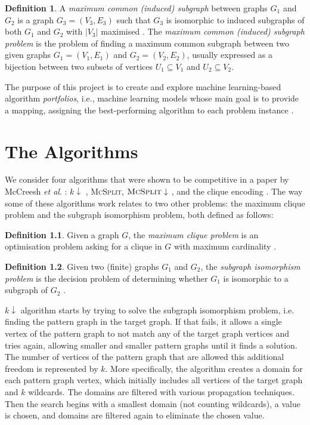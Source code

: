 \documentclass{l4proj}
\theoremstyle{definition}
\newtheorem{definition}{Definition}[chapter]
\theoremstyle{remark}
\begin{document}
\begin{definition}
  A \emph{maximum common (induced) subgraph} between graphs $G_1$ and $G_2$ is a
  graph $G_3 = (V_3, E_3)$ such that $G_3$ is isomorphic to induced subgraphs of
  both $G_1$ and $G_2$ with $|V_3|$ maximised
  \cite{DBLP:journals/jcamd/RaymondW02a}. The \emph{maximum common (induced)
    subgraph problem} is the problem of finding a maximum common subgraph
  between two given graphs $G_1 = (V_1, E_1)$ and $G_2 = (V_2, E_2)$, usually
  expressed as a bijection between two subsets of vertices $U_1 \subseteq V_1$
  and $U_2 \subseteq V_2$.
\end{definition}

The purpose of this project is to create and explore machine learning-based
algorithm \emph{portfolios}, i.e., machine learning models whose main goal is to
provide a mapping, assigning the best-performing algorithm to each problem
instance \cite{DBLP:journals/ai/BischlKKLMFHHLT16, DBLP:journals/ac/Rice76}.

\chapter{The Algorithms}

We consider four algorithms that were shown to be competitive in a paper by
McCreesh \textit{et al}. \cite{DBLP:conf/ijcai/McCreeshPT17}: $k\downarrow$
\cite{DBLP:conf/aaai/HoffmannMR17}, \textsc{McSplit},
$\textsc{McSplit}\downarrow$ \cite{DBLP:conf/ijcai/McCreeshPT17}, and the clique
encoding \cite{DBLP:conf/cp/McCreeshNPS16}. The way some of these algorithms
work relates to two other problems: the maximum clique problem and the subgraph
isomorphism problem, both defined as follows:

\begin{definition}
  Given a graph $G$, the \emph{maximum clique problem} is an optimisation problem
  asking for a clique in $G$ with maximum cardinality
  \cite{DBLP:journals/jgo/PardalosX94a}.
\end{definition}

\begin{definition}
  Given two (finite) graphs $G_1$ and $G_2$, the \emph{subgraph isomorphism
    problem} is the decision problem of determining whether $G_1$ is isomorphic
  to a subgraph of $G_2$ \cite{DBLP:conf/stoc/Cook71}.
\end{definition}

$k\downarrow$ algorithm \cite{DBLP:conf/aaai/HoffmannMR17} starts by trying to
solve the subgraph isomorphism problem, i.e. finding the pattern graph in the
target graph. If that fails, it allows a single vertex of the pattern graph to
not match any of the target graph vertices and tries again, allowing smaller and
smaller pattern graphs until it finds a solution. The number of vertices of the
pattern graph that are allowed this additional freedom is represented by $k$.
More specifically, the algorithm creates a domain for each pattern graph vertex,
which initially includes all vertices of the target graph and $k$ wildcards. The
domains are filtered with various propagation techniques. Then the search begins
with a smallest domain (not counting wildcards), a value is chosen, and domains
are filtered again to eliminate the chosen value.
\end{document}
